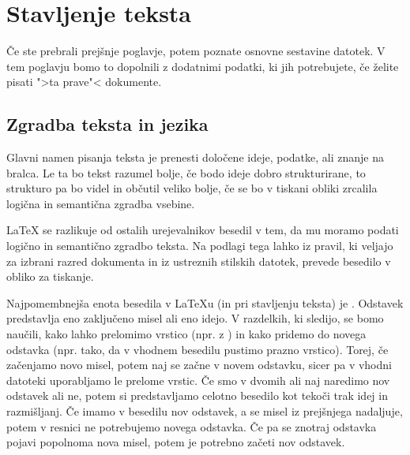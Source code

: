 \chapter{Stavljenje teksta}

\begin{intro}
  Če ste prebrali prejšnje poglavje, potem poznate
  osnovne sestavine \LaTeXe{} datotek. V tem poglavju bomo to
  dopolnili z dodatnimi podatki, ki jih potrebujete, če želite
  pisati  ">ta prave"< dokumente.
\end{intro}

\section{Zgradba teksta in jezika}
Glavni namen pisanja teksta je prenesti določene ideje, podatke, ali znanje na bralca. 
Le ta bo tekst razumel bolje, če bodo ideje dobro strukturirane, to strukturo pa bo videl in občutil
veliko bolje, če se bo v tiskani obliki zrcalila logična in semantična zgradba vsebine.

\LaTeX{} se razlikuje od ostalih urejevalnikov besedil v tem, da mu moramo 
podati logično in semantično zgradbo teksta. Na podlagi tega lahko iz
pravil, ki veljajo za izbrani razred dokumenta in iz ustreznih stilskih datotek,
prevede besedilo v obliko za tiskanje.

Najpomembnejša enota besedila v \LaTeX{}u (in pri stavljenju teksta) je 
.  Odstavek predstavlja eno zaključeno misel ali eno idejo. V raz\-del\-kih, 
ki sledijo, se
bomo naučili, kako lahko prelomimo vrstico (npr.{} z \texttt{\bs\bs}) in kako pridemo do novega
odstavka (npr.{} tako, da v vhodnem besedilu pustimo prazno vrstico). Torej, če začenjamo novo
misel, potem naj se začne v novem odstavku, sicer pa v vhodni datoteki uporabljamo le 
prelome vrstic.  Če smo v dvomih ali naj naredimo nov odstavek ali ne, potem si predstavljamo
celotno besedilo kot tekoči trak idej in razmišljanj.  Če imamo v besedilu nov odstavek, a se misel
iz prejšnjega nadaljuje, potem v resnici ne potrebujemo novega odstavka. Če pa se znotraj odstavka pojavi
popolnoma nova misel, potem je potrebno začeti nov odstavek.

